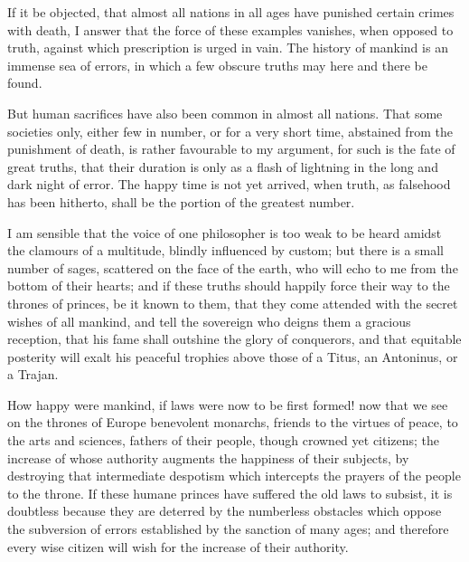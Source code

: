 If it be objected, that almost all nations in all ages have punished
certain crimes with death, I answer that the force of these examples
vanishes, when opposed to truth, against which prescription 
is urged in vain. The history of mankind is an immense sea of errors,
in which a few obscure truths may here and there be found.

But human sacrifices have also been common in almost all nations. That
some societies only, either few in number, or for a very short time,
abstained from the punishment of death, is rather favourable to my
argument, for such is the fate of great truths, that their duration is
only as a flash of lightning in the long and dark night of error. The
happy time is not yet arrived, when truth, as falsehood has been
hitherto, shall be the portion of the greatest number.

I am sensible that the voice of one philosopher is too weak to be
heard amidst the clamours of a multitude, blindly influenced by
custom; but there is a small number of sages, scattered on the face of
the earth, who will echo to me from the bottom of their hearts; and if
these truths should happily force their way to the thrones of princes,
be it known to them, that they come attended with the secret wishes of
all mankind, and tell the sovereign who deigns them a gracious
reception, that his fame shall outshine the glory of conquerors, and
that equitable posterity will exalt his peaceful trophies above those
of a Titus, an Antoninus, or a Trajan.

How happy were mankind, if laws were now to be first formed!
now that we see on the thrones of Europe benevolent monarchs, friends
to the virtues of peace, to the arts and sciences, fathers of their
people, though crowned yet citizens; the increase of whose authority
augments the happiness of their subjects, by destroying that
intermediate despotism which intercepts the prayers of the people to
the throne. If these humane princes have suffered the old laws to
subsist, it is doubtless because they are deterred by the numberless
obstacles which oppose the subversion of errors established by the
sanction of many ages; and therefore every wise citizen will wish for
the increase of their authority.

